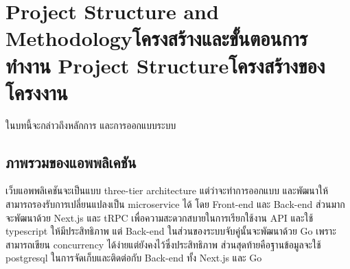 \chapter{\ifproject%
    \ifenglish Project Structure and Methodology\else โครงสร้างและขั้นตอนการทำงาน\fi
  \else%
    \ifenglish Project Structure\else โครงสร้างของโครงงาน\fi
  \fi
 }

ในบทนี้จะกล่าวถึงหลักการ และการออกแบบระบบ

\makeatletter


\makeatother

\section{ภาพรวมของแอพพลิเคชัน}

เว็บแอพพลิเคชันจะเป็นแบบ three-tier architecture แต่ว่าจะทำการออกแบบ และพัฒนาให้สามารถรองรับการเปลี่ยนแปลงเป็น 
microservice ได้ โดย Front-end และ Back-end ส่วนมากจะพัฒนาด้วย Next.js และ tRPC เพื่อความสะดวกสบายในการเรียกใช้งาน API
และใช้ typescript ให้มีประสิทธิภาพ แต่ Back-end ในส่วนของระบบจับคู่นั้นจะพัฒนาด้วย Go เพราะสามารถเขียน concurrency ได้ง่ายแต่ยังคงไว้ซึ่งประสิทธิภาพ
ส่วนสุดท้ายคือฐานข้อมูลจะใช้ postgresql ในการจัดเก็บและติดต่อกับ Back-end ทั้ง Next.js และ Go

